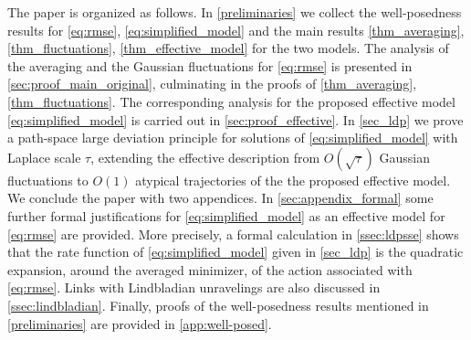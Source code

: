 \documentclass[a4paper,10pt]{amsart}
\theoremstyle{remark}
\numberwithin{equation}{section}
\begin{document}
The paper is organized as follows. In \autoref{preliminaries} we collect the well-posedness results
for \eqref{eq:rmse}, \eqref{eq:simplified_model} and the main results \autoref{thm_averaging}, \autoref{thm_fluctuations}, \autoref{thm_effective_model} for the two models. The analysis of the averaging and the Gaussian fluctuations for \eqref{eq:rmse} is presented in \autoref{sec:proof_main_original}, culminating in the proofs of \autoref{thm_averaging}, \autoref{thm_fluctuations}. The corresponding analysis for the proposed effective model \eqref{eq:simplified_model} is carried out in \autoref{sec:proof_effective}. In \autoref{sec_ldp} we prove a path-space large deviation principle for solutions of \eqref{eq:simplified_model} with Laplace scale $\tau$, extending the effective description from $O(\sqrt{\tau})$ Gaussian fluctuations to $O(1)$ atypical trajectories of the the proposed effective model. 
We conclude the paper with two appendices. In \autoref{sec:appendix_formal} some further formal justifications for \eqref{eq:simplified_model} as an effective model for \eqref{eq:rmse} are provided. More precisely, a formal calculation in \autoref{ssec:ldpsse} shows that the rate function of \eqref{eq:simplified_model} given in \autoref{sec_ldp} is the quadratic expansion, around the averaged minimizer, of the action associated with \eqref{eq:rmse}. Links with Lindbladian unravelings are also discussed in \autoref{ssec:lindbladian}. 
Finally, proofs of the well-posedness results mentioned in \autoref{preliminaries} are provided in \autoref{app:well-posed}.

\end{document}
